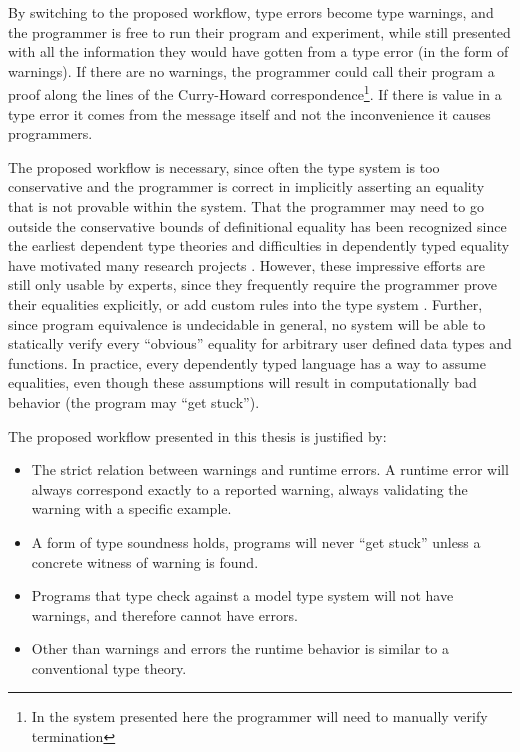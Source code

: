 By switching to the proposed workflow, type errors become type warnings, and the programmer is free to run their program and experiment, while still presented with all the information they would have gotten from a type error (in the form of warnings).
If there are no warnings, the programmer could call their program a proof along the lines of the Curry-Howard correspondence\footnote{
  In the system presented here the programmer will need to manually verify termination
}.
If there is value in a type error it comes from the message itself and not the inconvenience it causes programmers.

The proposed workflow is necessary, since often the type system is too conservative and the programmer is correct in implicitly asserting an equality that is not provable within the system.
That the programmer may need to go outside the conservative bounds of definitional equality has been recognized since the earliest dependent type theories \cite{Martin-Lof-1972} and difficulties in dependently typed equality have motivated many research projects \cite{HoTTbook,sjoberg2015programming,cockx2021taming}.
However, these impressive efforts are still only usable by experts, since they frequently require the programmer prove their equalities explicitly\cite{HoTTbook,sjoberg2015programming}, or add custom rules into the type system \cite{cockx2021taming}.
Further, since program equivalence is undecidable in general, no system will be able to statically verify every ``obvious'' equality for arbitrary user defined data types and functions.
In practice, every dependently typed language has a way to assume equalities, even though these assumptions will result in computationally bad behavior (the program may ``get stuck'').

The proposed workflow presented in this thesis is justified by:
\begin{itemize}
\item The strict relation between warnings and runtime errors.
A runtime error will always correspond exactly to a reported warning, always validating the warning with a specific example.
\item A form of type soundness holds, programs will never ``get stuck'' unless a concrete witness of warning is found.
\item Programs that type check against a model type system will not have warnings, and therefore cannot have errors.
\item Other than warnings and errors the runtime behavior is similar to a conventional type theory.
\end{itemize}

